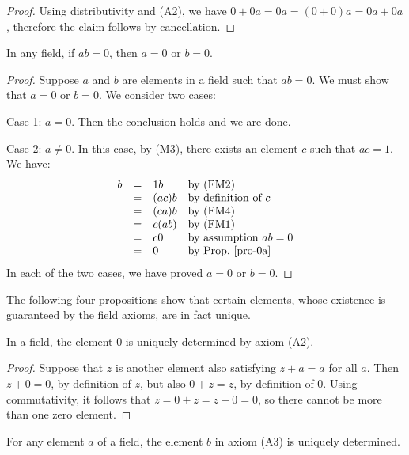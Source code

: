 {\begin{proof}
  Using distributivity and (A2), we have $0+0a = 0a = (0+0)a = 0a+0a$,
  therefore the claim follows by cancellation.\eot
\end{proof}

\begin{proposition}
  In any field, if $ab=0$, then $a=0$ or $b=0$.
\end{proposition}

\begin{proof}
  Suppose $a$ and $b$ are elements in a field such that $ab=0$. We
  must show that $a=0$ or $b=0$. We consider two cases:

  Case 1: $a=0$. Then the conclusion holds and we are done.

  Case 2: $a\neq 0$. In this case, by (M3), there exists an element
  $c$ such that $ac=1$. We have:
  \[ \begin{array}{llll}
    b &=& 1b &\mbox{by (FM2)} \\
    &=& (ac)b &\mbox{by definition of $c$} \\
    &=& (ca)b &\mbox{by (FM4)} \\
    &=& c(ab) &\mbox{by (FM1)} \\
    &=& c0    &\mbox{by assumption $ab=0$} \\
    &=& 0     &\mbox{by Prop.~\ref{pro-0a}}
  \end{array}
  \]
  In each of the two cases, we have proved $a=0$ or $b=0$. \eot
\end{proof}

The following four propositions show that certain elements, whose
existence is guaranteed by the field axioms, are in fact unique.

\begin{proposition}
  In a field, the element $0$ is uniquely determined by axiom (A2).
\end{proposition}

\begin{proof}
  Suppose that $z$ is another element also satisfying $z+a=a$ for all
  $a$. Then $z+0=0$, by definition of $z$, but also $0+z=z$, by
  definition of $0$. Using commutativity, it follows that
  $z=0+z=z+0=0$, so there cannot be more than one zero element.\eot
\end{proof}

\begin{proposition}\label{pro-uniq-a3}
  For any element $a$ of a field, the element $b$ in axiom (A3) is
  uniquely determined.
\end{proposition}

}
